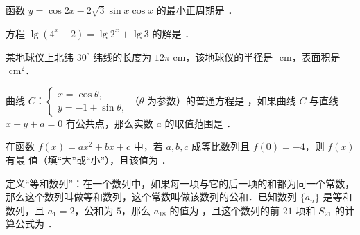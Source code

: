 \begin{question}
函数 $y=\cos 2x-2\sqrt{3}\sin x\cos x$ 的最小正周期是 \underline{\hspace{3em}}．

\end{question}
\begin{question}
方程 $\lg(4^x+2)=\lg 2^x+\lg 3$ 的解是 \underline{\hspace{3em}}．

\end{question}
\begin{question}
某地球仪上北纬 $30^\circ$ 纬线的长度为 $12\pi\text{ cm}$，该地球仪的半径是 \underline{\hspace{3em}}$\text{ cm}$，表面积是 \underline{\hspace{3em}}$\text{ cm}^2$．

\end{question}
\begin{question}
曲线 $C$：$\begin{cases} x=\cos\theta, \\ y=-1+\sin\theta, \end{cases}$（$\theta$ 为参数）的普通方程是 \underline{\hspace{3em}}，如果曲线 $C$ 与直线 $x+y+a=0$ 有公共点，那么实数 $a$ 的取值范围是 \underline{\hspace{3em}}．

\end{question}
\begin{question}
在函数 $f(x)=ax^2+bx+c$ 中，若 $a, b, c$ 成等比数列且 $f(0)=-4$，则 $f(x)$ 有最 \underline{\hspace{2em}} 值（填“大”或“小”），且该值为 \underline{\hspace{3em}}．

\end{question}
\begin{question}
定义“等和数列”：在一个数列中，如果每一项与它的后一项的和都为同一个常数，那么这个数列叫做等和数列，这个常数叫做该数列的公和．已知数列 $\{a_n\}$ 是等和数列，且 $a_1=2$，公和为 $5$，那么 $a_{18}$ 的值为 \underline{\hspace{3em}}，且这个数列的前 $21$ 项和 $S_{21}$ 的计算公式为 \underline{\hspace{3em}}．

\end{question}

